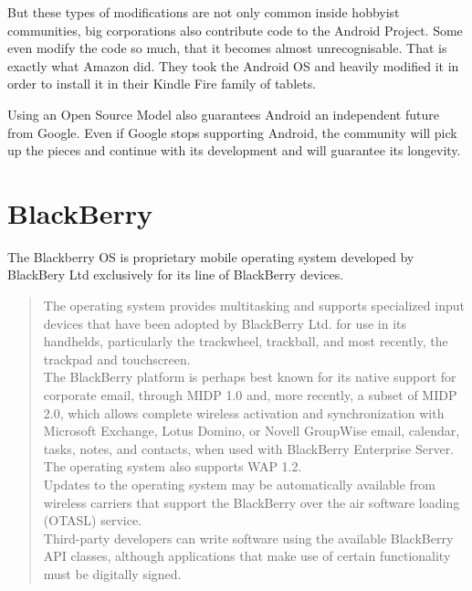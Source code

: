 But these types of modifications are not only common inside hobbyist communities, big corporations also contribute code to the Android Project. Some even modify the code so much, that it becomes almost unrecognisable. That is exactly what Amazon did. They took the Android OS and heavily modified it in order to install it in their Kindle Fire family of tablets.


Using an Open Source Model also guarantees Android an independent future from Google. Even if Google stops supporting  Android, the community will pick up the pieces and continue with its development and will guarantee its longevity.
 
\section{BlackBerry}
The Blackberry OS is proprietary mobile operating system developed by BlackBery Ltd exclusively for its line of BlackBerry devices.

\begin{quotation}
The operating system provides multitasking and supports specialized input devices that have been adopted by BlackBerry Ltd. for use in its handhelds, particularly the trackwheel, trackball, and most recently, the trackpad and touchscreen.\\

The BlackBerry platform is perhaps best known for its native support for corporate email, through MIDP 1.0 and, more recently, a subset of MIDP 2.0, which allows complete wireless activation and synchronization with Microsoft Exchange, Lotus Domino, or Novell GroupWise email, calendar, tasks, notes, and contacts, when used with BlackBerry Enterprise Server. The operating system also supports WAP 1.2.\\

Updates to the operating system may be automatically available from wireless carriers that support the BlackBerry over the air software loading (OTASL) service.\\

Third-party developers can write software using the available BlackBerry API classes, although applications that make use of certain functionality must be digitally signed.
\cite{wikipedia:bb}
\end{quotation}


